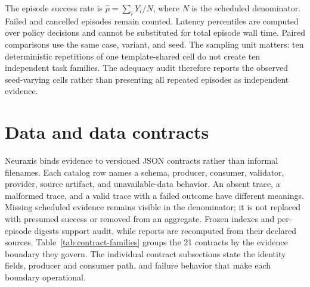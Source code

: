 The episode success rate is $\widehat p=\sum_iY_i/N$, where $N$ is the scheduled denominator. Failed and cancelled episodes remain counted. Latency percentiles are computed over policy decisions and cannot be substituted for total episode wall time. Paired comparisons use the same case, variant, and seed. The sampling unit matters: ten deterministic repetitions of one template-shared cell do not create ten independent task families. The adequacy audit therefore reports the observed seed-varying cells rather than presenting all repeated episodes as independent evidence.

\section{Data and data contracts}
Neuraxis binds evidence to versioned JSON contracts rather than informal filenames. Each catalog row names a schema, producer, consumer, validator, provider, source artifact, and unavailable-data behavior. An absent trace, a malformed trace, and a valid trace with a failed outcome have different meanings. Missing scheduled evidence remains visible in the denominator; it is not replaced with presumed success or removed from an aggregate. Frozen indexes and per-episode digests support audit, while reports are recomputed from their declared sources. Table~\ref{tab:contract-families} groups the 21 contracts by the evidence boundary they govern. The individual contract subsections state the identity fields, producer and consumer path, and failure behavior that make each boundary operational.

